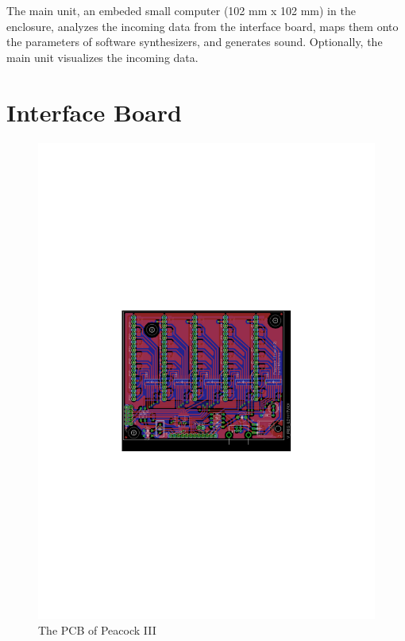 \documentclass{nime-alternate}
\begin{document}
The main unit, an embeded small computer (102 mm x 102 mm) in the enclosure, analyzes the incoming data from the interface board, maps them onto the parameters of software synthesizers, and generates sound. Optionally, the main unit visualizes the incoming data.


\section{Interface Board} %

\begin{figure}[htbp]
       \begin{center}
              \includegraphics[width=1\columnwidth]{board}
       \end{center}
       \caption{The PCB of Peacock III}
       \label{fig:board}
\end{figure}
\end{document}
